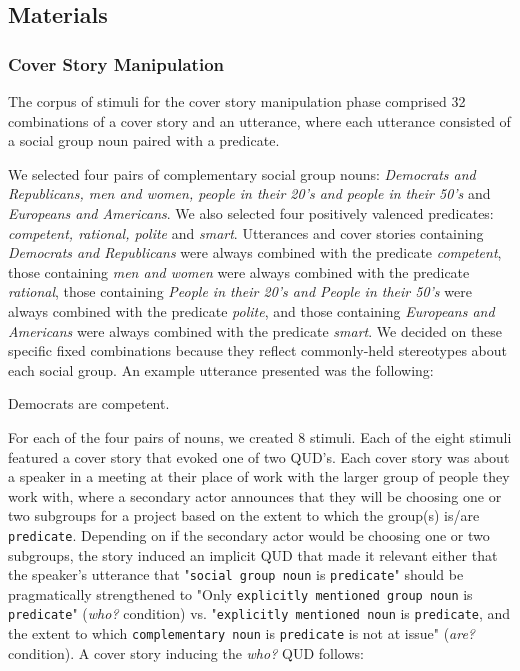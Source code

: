 \documentclass[11pt,a4paper]{article}
\begin{document}
\subsection{Materials}
\subsubsection{Cover Story Manipulation}
The corpus of stimuli for the cover story manipulation phase comprised 32 combinations of a cover story and an utterance, where each utterance consisted of a social group noun paired with a predicate. 

We selected four pairs of complementary social group nouns: \textit{Democrats and Republicans, men and women, people in their 20's and people in their 50's} and \textit{Europeans and Americans}. We also selected four positively valenced predicates: \textit{competent, rational, polite} and \textit{smart}. Utterances and cover stories containing \textit{Democrats and Republicans} were always combined with the predicate \textit{competent}, those containing \textit{men and women} were always combined with the predicate \textit{rational}, those containing \textit{People in their 20's and People in their 50's} were always combined with the predicate \textit{polite}, and those containing \textit{Europeans and Americans} were always combined with the predicate \textit{smart}. We decided on these specific fixed combinations because they reflect commonly-held stereotypes about each social group. An example utterance presented was the following:

\begin{exe}
\ex\label{string} {Democrats are competent.}
\end{exe}

For each of the four pairs of nouns, we created 8 stimuli. Each of the eight stimuli featured a cover story that evoked one of two QUD's. Each cover story was about a speaker in a meeting at their place of work with the larger group of people they work with, where a secondary actor announces that they will be choosing one or two subgroups for a project based on the extent to which the group(s) is/are \texttt{predicate}. Depending on if the secondary actor would be choosing one or two subgroups, the story induced an implicit QUD that made it relevant either that the speaker's utterance that "\texttt{social group noun} is \texttt{predicate}" should be pragmatically strengthened to "Only \texttt{explicitly mentioned group noun} is \texttt{predicate}" (\textit{who?} condition) vs. "\texttt{explicitly mentioned noun} is \texttt{predicate}, and the extent to which \texttt{complementary noun} is \texttt{predicate} is not at issue" (\textit{are?} condition). A cover story inducing the \textit{who?} QUD follows:
\end{document}
